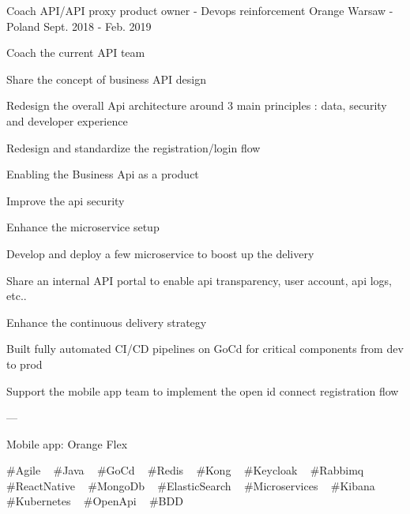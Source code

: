 \begin{cventries}
  \cventry
    {Coach API/API proxy product owner - Devops reinforcement} %
    {Orange} %
    {Warsaw - Poland} %
    {Sept. 2018 - Feb. 2019} %
    {
      \begin{cvitems} %
        \item {Coach the current API team}
        \item {Share the concept of business API design}
        \item {Redesign the overall Api architecture around 3 main principles : data, security and developer experience}
        \item {Redesign and standardize the registration/login flow}
        \item {Enabling the Business Api as a product}
        \item {Improve the api security}
        \item {Enhance the microservice setup}
        \item {Develop and deploy a few microservice to boost up the delivery}
        \item {Share an internal API portal to enable api transparency, user account, api logs, etc..}
        \item {Enhance the continuous delivery strategy}
        \item {Built fully automated CI/CD pipelines on GoCd for critical components from dev to prod}
        \item {Support the mobile app team to implement the open id connect registration flow}
        \item {---}
        \item {Mobile app: Orange Flex}
      \end{cvitems}
    }
    {
      \#Agile ~
      \#Java ~
      \#GoCd ~
      \#Redis ~
      \#Kong ~
      \#Keycloak ~
      \#Rabbimq ~
      \#ReactNative ~
      \#MongoDb ~
      \#ElasticSearch ~
      \#Microservices ~
      \#Kibana ~
      \#Kubernetes ~
      \#OpenApi ~
      \#BDD
    }


\end{cventries}
